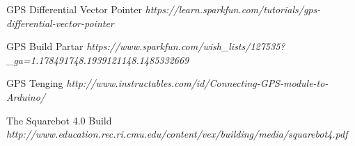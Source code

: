   \begin{thebibliography}{1}

   GPS Differential Vector Pointer {\em https://learn.sparkfun.com/tutorials/gps-differential-vector-pointer}

   GPS Build Partar {\em https://www.sparkfun.com/wish_lists/127535?_ga=1.178491748.1939121148.1485332669}

    GPS Tenging {\em http://www.instructables.com/id/Connecting-GPS-module-to-Arduino/}

   The Squarebot 4.0 Build {\em http://www.education.rec.ri.cmu.edu/content/vex/building/media/squarebot4.pdf}

  \end{thebibliography}

